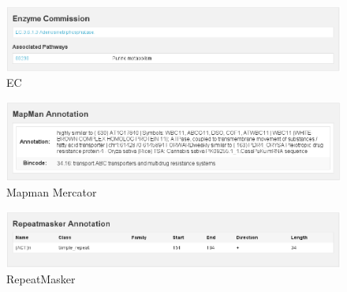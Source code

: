 \documentclass[english]{scrartcl}
\begin{document}
\begin{figure}
\begin{center}
  \includegraphics[width=\textwidth]{figures/ec.png}
  \caption{EC}
  \label{fig:ec}
\end{center}
\end{figure}

\begin{figure}
\begin{center}
  \includegraphics[width=\textwidth]{figures/mapman.png}
  \caption{Mapman Mercator}
  \label{fig:mapman}
\end{center}
\end{figure}

\begin{figure}
\begin{center}
  \includegraphics[width=\textwidth]{figures/repeatmasker.png}
  \caption{RepeatMasker}
  \label{fig:repeatmasker}
\end{center}
\end{figure}
\end{document}
